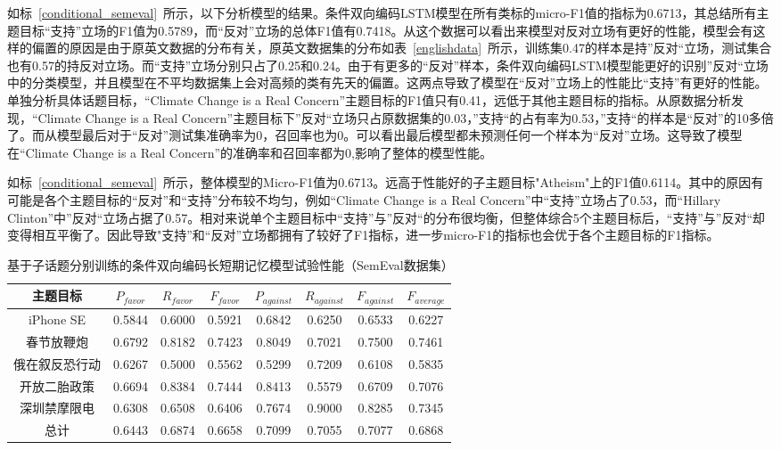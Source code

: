 如标~\ref{conditional_semeval}~所示，以下分析模型的结果。条件双向编码LSTM模型在所有类标的micro-F1值的指标为0.6713，其总结所有主题目标“支持”立场的F1值为0.5789，而“反对”立场的总体F1值有0.7418。从这个数据可以看出来模型对反对立场有更好的性能，模型会有这样的偏置的原因是由于原英文数据的分布有关，原英文数据集的分布如表~\ref{englishdata}~所示，训练集0.47的样本是持”反对“立场，测试集合也有0.57的持反对立场。而“支持”立场分别只占了0.25和0.24。由于有更多的“反对”样本，条件双向编码LSTM模型能更好的识别”反对“立场中的分类模型，并且模型在不平均数据集上会对高频的类有先天的偏置。这两点导致了模型在“反对”立场上的性能比“支持”有更好的性能。单独分析具体话题目标，“Climate Change is a Real Concern”主题目标的F1值只有0.41，远低于其他主题目标的指标。从原数据分析发现，“Climate Change is a Real Concern”主题目标下”反对“立场只占原数据集的0.03，”支持“的占有率为0.53，”支持“的样本是“反对”的10多倍了。而从模型最后对于“反对”测试集准确率为0，召回率也为0。可以看出最后模型都未预测任何一个样本为“反对”立场。这导致了模型在“Climate Change is a Real Concern”的准确率和召回率都为0,影响了整体的模型性能。

如标~\ref{conditional_semeval}~所示，整体模型的Micro-F1值为0.6713。远高于性能好的子主题目标"Atheism"上的F1值0.6114。其中的原因有可能是各个主题目标的“反对”和“支持”分布较不均匀，例如“Climate Change is a Real Concern”中“支持”立场占了0.53，而“Hillary Clinton”中”反对“立场占据了0.57。相对来说单个主题目标中“支持”与”反对“的分布很均衡，但整体综合5个主题目标后，“支持”与”反对“却变得相互平衡了。因此导致"支持”和“反对”立场都拥有了较好了F1指标，进一步micro-F1的指标也会优于各个主题目标的F1指标。

\begin{table}[htbp]
	\caption[table123]{基于子话题分别训练的条件双向编码长短期记忆模型试验性能（SemEval数据集）}
	\label{chinesedata}
	\vspace{0.5em}\centering\wuhao
	\begin{tabular}{cccccccc}
		\toprule[1.5pt]
	主题目标& $P_{favor}$&$R_{favor}$&$F_{favor}$&$P_{against}$&$R_{against}$&$F_{against}$&$F_{average}$ \\
		\midrule[1pt]
		iPhone SE&0.5844&0.6000&0.5921&0.6842&0.6250&0.6533&0.6227\\
		春节放鞭炮&0.6792&0.8182&0.7423&0.8049&0.7021&0.7500&0.7461\\
		俄在叙反恐行动&0.6267&0.5000&0.5562&0.5299&0.7209&0.6108&0.5835\\
		开放二胎政策&0.6694&0.8384&0.7444&0.8413&0.5579&0.6709&0.7076\\
		深圳禁摩限电&0.6308&0.6508&0.6406&0.7674&0.9000&0.8285&0.7345\\
		总计&0.6443&0.6874&0.6658&0.7099&0.7055&0.7077&0.6868\\
		\bottomrule[1.5pt]
	\end{tabular}
\end{table}

